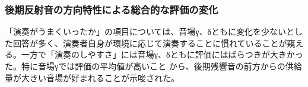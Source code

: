 \documentclass[11pt,a4j]{jreport}
\begin{document}

\newpage
\subsubsection*{後期反射音の方向特性による総合的な評価の変化}

「演奏がうまくいったか」の項目については、音場γ、δともに変化を少ないとした回答が多く、演奏者自身が環境に応じて演奏することに慣れていることが窺える。一方で「演奏のしやすさ」には音場γ、δともに評価にはばらつきが大きかった。特に音場γでは評価の平均値が高いこと から、後期残響音の前方からの供給量が大きい音場が好まれることが示唆された。

\end{document}
